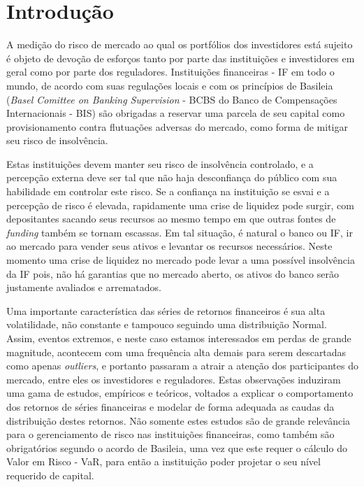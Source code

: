 \documentclass[1p]{elsarticle}
\theoremstyle{definition}
\begin{document}
\linenumbers

\section{Introdução}

A medição do risco de mercado ao qual os portfólios dos investidores está sujeito é objeto de devoção de esforços tanto por parte das instituições e investidores em geral como por parte dos reguladores. Instituições financeiras - IF em todo o mundo, de acordo com suas regulações locais e com os princípios de Basileia (\emph{Basel Comittee on Banking Supervision} - BCBS do Banco de Compensações Internacionais - BIS) são obrigadas a reservar uma parcela de seu capital como provisionamento contra flutuações adversas do mercado, como forma de mitigar seu risco de insolvência.

Estas instituições devem manter seu risco de insolvência controlado, e a percepção externa deve ser tal que não haja desconfiança do público com sua habilidade em controlar este risco. Se a confiança na instituição se esvai e a percepção de risco é elevada, rapidamente uma crise de liquidez pode surgir, com depositantes sacando seus recursos ao mesmo tempo em que outras fontes de \emph{funding} também se tornam escassas. Em tal situação, é natural o banco ou IF, ir ao mercado para vender seus ativos e levantar os recursos necessários. Neste momento uma crise de liquidez no mercado pode levar a uma possível insolvência da IF pois, não há garantias que no mercado aberto, os ativos do banco serão justamente avaliados e arrematados.

Uma importante característica das séries de retornos financeiros é sua alta volatilidade, não constante e tampouco seguindo uma distribuição Normal. Assim, eventos extremos, e neste caso estamos interessados em perdas de grande magnitude, acontecem com uma frequência alta demais para serem descartadas como apenas \emph{outliers}, e portanto passaram a atrair a atenção dos participantes do mercado, entre eles os investidores e reguladores. Estas observações induziram uma gama de estudos, empíricos e teóricos, voltados a explicar o comportamento dos retornos de séries financeiras e modelar de forma adequada as caudas da distribuição destes retornos. Não somente estes estudos são de grande relevância para o gerenciamento de risco nas instituições financeiras, como também são obrigatórios segundo o acordo de Basileia, uma vez que este requer o cálculo do Valor em Risco - VaR, para então a instituição poder projetar o seu nível requerido de capital. 
\end{document}
